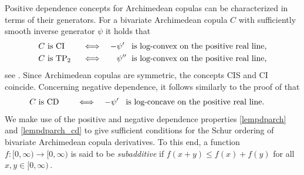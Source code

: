 \documentclass{article}
\newcommand{\TP}{\mathrm{TP_2}}
\begin{document}
Positive dependence concepts for Archimedean copulas can be characterized in terms of their generators.
For a bivariate Archimedean copula \(C\) with sufficiently smooth inverse generator \(\psi\) it holds that
\begin{align}\label{lempdparch}
    C \text{ is CI\phantom{\(\TP\)}} &~ \Longleftrightarrow \quad -\psi'\phantom{''} \text{ is log-convex on the positive real line,}\\
    \label{lempdparch2} C \text{ is \(\TP\)\phantom{CI}} &~ \Longleftrightarrow \quad \phantom{-}\psi''\phantom{'} \text{ is log-convex on the positive real line,}
\end{align}
see \cite[Theorems 2.8 and 2.11]{Mueller-2005}.
Since Archimedean copulas are symmetric, the concepts CIS and CI coincide.
Concerning negative dependence, it follows similarly to the proof of \cite[Theorems 2.8]{Mueller-2005} that
\begin{align}\label{lempdparch_cd}
    C \text{ is CD\phantom{\(\TP\)}} &~ \Longleftrightarrow \quad -\psi'\phantom{''} \text{ is log-concave on the positive real line.}\
\end{align}
We make use of the positive and negative dependence properties \eqref{lempdparch} and \eqref{lempdparch_cd} to give sufficient conditions for the Schur ordering of bivariate Archimedean copula derivatives.
To this end, a function \(f\colon [0,\infty)\to [0,\infty)\) is said to be \textit{subadditive} if \(f(x+y)\leq f(x)+f(y)\) for all \(x,y\in [0,\infty)\,.\)
\end{document}
